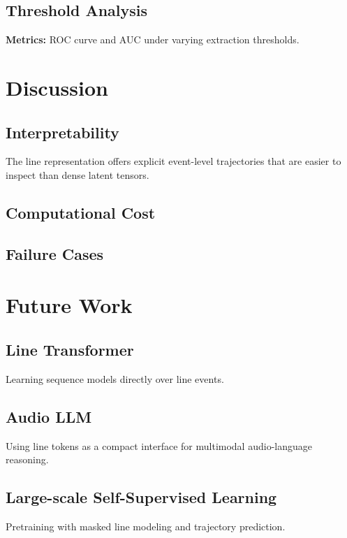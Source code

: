 \documentclass[11pt]{article}
\begin{document}
\subsection{Threshold Analysis}
\textbf{Metrics:} ROC curve and AUC under varying extraction thresholds.

\section{Discussion}
\subsection{Interpretability}
The line representation offers explicit event-level trajectories that are easier to inspect than dense latent tensors.

\subsection{Computational Cost}

\subsection{Failure Cases}

\section{Future Work}
\subsection{Line Transformer}
Learning sequence models directly over line events.

\subsection{Audio LLM}
Using line tokens as a compact interface for multimodal audio-language reasoning.

\subsection{Large-scale Self-Supervised Learning}
Pretraining with masked line modeling and trajectory prediction.
\end{document}
